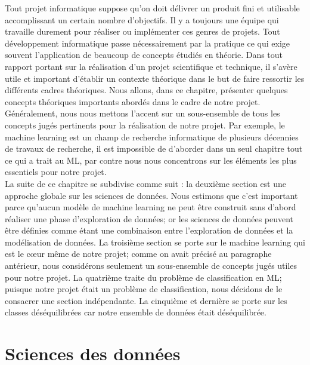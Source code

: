 \documentclass[12pt, french]{report}
\begin{document}
Tout projet informatique suppose qu'on doit délivrer un produit fini et utilisable accomplissant un certain nombre d'objectifs. Il y a toujours une équipe qui travaille durement pour réaliser ou implémenter ces genres de projets. Tout développement informatique passe nécessairement par la pratique ce qui exige souvent l'application de beaucoup de concepts étudiés en théorie. Dans tout rapport portant sur la réalisation d'un projet scientifique et technique, il s'avère utile et important d'établir un contexte théorique dans le but de faire ressortir les différents cadres théoriques. Nous allons, dans ce chapitre, présenter quelques concepts théoriques importants abordés dans le cadre de notre projet.\\

Généralement, nous nous mettons l'accent sur un sous-ensemble de tous les concepts jugés pertinents pour la réalisation de notre projet. Par exemple, le machine learning est un champ de recherche informatique de plusieurs décennies de travaux de recherche, il est impossible de d'aborder dans un seul chapitre tout ce qui a trait au ML, par contre nous nous concentrons sur les éléments les plus essentiels pour notre projet. \\      

La suite de ce chapitre se subdivise comme suit : la deuxième section est une approche globale sur les sciences de données. Nous estimons que c'est important parce qu'aucun modèle de machine learning ne peut être construit sans d'abord réaliser une phase d'exploration de données; or les sciences de données peuvent être définies comme étant une combinaison entre l'exploration de données et la modélisation de données. La troisième section se porte sur le machine learning qui est le cœur même de notre projet; comme on avait précisé au paragraphe antérieur, nous considérons seulement un sous-ensemble de concepts jugés utiles pour notre projet. La quatrième traite du problème de classification en ML; puisque notre projet était un problème de classification, nous décidons de le consacrer une section indépendante. La cinquième et dernière se porte sur les classes déséquilibrées car notre ensemble de données était déséquilibrée.     

\section{Sciences des données}
\end{document}

